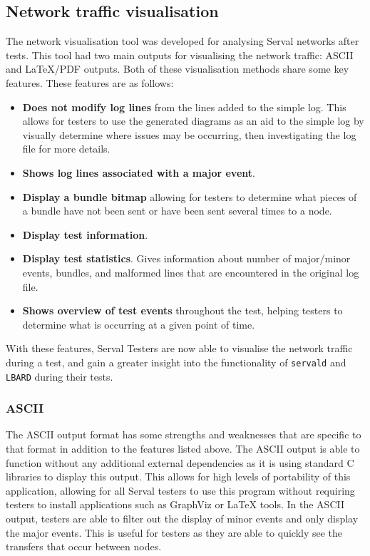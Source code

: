 \subsection{Network traffic visualisation}
The network visualisation tool was developed for analysing Serval networks  after tests.
This tool had two main outputs for visualising the network traffic: ASCII and LaTeX/PDF outputs.
Both of these visualisation methods share some key features.
These features are as follows:
\begin{itemize}
    \item \textbf{Does not modify log lines} from the lines added to the simple log. 
    This allows for testers to use the generated diagrams as an aid to the simple log by visually determine where issues may be occurring, then investigating the log file for more details. 
    \item \textbf{Shows log lines associated with a major event}. 
    \item \textbf{Display a bundle bitmap} allowing for testers to determine what pieces of a bundle have not been sent or have been sent several times to a node.
    \item \textbf{Display test information}.
    \item \textbf{Display test statistics}. 
    Gives information about number of major/minor events, bundles, and malformed lines that are encountered in the original log file.
    \item \textbf{Shows overview of test events} throughout the test, helping testers to determine what is occurring at a given point of time.
\end{itemize}
With these features, Serval Testers are now able to visualise the network traffic during a test, and gain a greater insight into the functionality of \texttt{servald} and \texttt{LBARD} during their tests.

\subsubsection{ASCII}
The ASCII output format has some strengths and weaknesses that are specific to that format in addition to the features listed above.
The ASCII output is able to function without any additional external dependencies as it is using standard C libraries to display this output.
This allows for high levels of portability of this application, allowing for all Serval testers to use this program without requiring testers to install applications such as GraphViz or LaTeX tools.
In the ASCII output, testers are able to filter out the display of minor events and only display the major events.
This is useful for testers as they are able to quickly see the transfers that occur between nodes.

